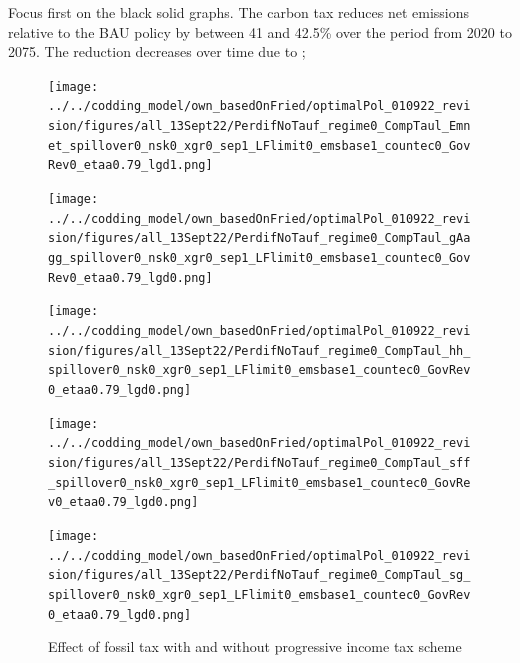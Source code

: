 Focus first on the black solid graphs. The carbon tax reduces net emissions relative to the BAU policy by between 41 and 42.5\% over the period from 2020 to 2075. The reduction decreases over time due to 
; 
\begin{figure}[h!!]
	\centering
	\caption{Effect of fossil tax with and without progressive income tax scheme}\label{fig:CompRegimes}
	\begin{minipage}[]{0.32\textwidth}
		\texttt{[image: ../../codding\_model/own\_basedOnFried/optimalPol\_010922\_revision/figures/all\_13Sept22/PerdifNoTauf\_regime0\_CompTaul\_Emnet\_spillover0\_nsk0\_xgr0\_sep1\_LFlimit0\_emsbase1\_countec0\_GovRev0\_etaa0.79\_lgd1.png]}
	\end{minipage}	
\begin{minipage}[]{0.32\textwidth}
	\texttt{[image: ../../codding\_model/own\_basedOnFried/optimalPol\_010922\_revision/figures/all\_13Sept22/PerdifNoTauf\_regime0\_CompTaul\_gAagg\_spillover0\_nsk0\_xgr0\_sep1\_LFlimit0\_emsbase1\_countec0\_GovRev0\_etaa0.79\_lgd0.png]}
\end{minipage}	
\begin{minipage}[]{0.32\textwidth}
\texttt{[image: ../../codding\_model/own\_basedOnFried/optimalPol\_010922\_revision/figures/all\_13Sept22/PerdifNoTauf\_regime0\_CompTaul\_hh\_spillover0\_nsk0\_xgr0\_sep1\_LFlimit0\_emsbase1\_countec0\_GovRev0\_etaa0.79\_lgd0.png]}
\end{minipage}	
\begin{minipage}[]{0.32\textwidth}
\texttt{[image: ../../codding\_model/own\_basedOnFried/optimalPol\_010922\_revision/figures/all\_13Sept22/PerdifNoTauf\_regime0\_CompTaul\_sff\_spillover0\_nsk0\_xgr0\_sep1\_LFlimit0\_emsbase1\_countec0\_GovRev0\_etaa0.79\_lgd0.png]}
\end{minipage}		
\begin{minipage}[]{0.32\textwidth}
\texttt{[image: ../../codding\_model/own\_basedOnFried/optimalPol\_010922\_revision/figures/all\_13Sept22/PerdifNoTauf\_regime0\_CompTaul\_sg\_spillover0\_nsk0\_xgr0\_sep1\_LFlimit0\_emsbase1\_countec0\_GovRev0\_etaa0.79\_lgd0.png]}

\end{minipage}
\end{figure}
